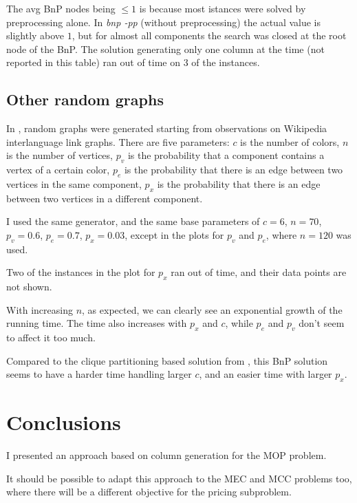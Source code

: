 \documentclass{article}
\begin{document}
The avg BnP nodes being $\le 1$ is because most istances were solved by preprocessing alone.
In \textit{bnp -pp} (without preprocessing) the actual value is slightly above $1$,
but for almost all components the search was closed at the root node of the BnP.
The solution generating only one column at the time (not reported in this table) ran out of time on 3 of the instances.

\subsection{Other random graphs}
\label{org}

In \parencite{mop2013}, random graphs were generated starting from observations on Wikipedia interlanguage link graphs.
There are five parameters:
$c$ is the number of colors,
$n$ is the number of vertices,
$p_v$ is the probability that a component contains a vertex of a certain color,
$p_e$ is the probability that there is an edge between two vertices in the same component,
$p_x$ is the probability that there is an edge between two vertices in a different component.

I used the same generator, and the same base parameters of $c=6$, $n=70$, $p_v=0.6$, $p_e=0.7$, $p_x=0.03$,
except in the plots for $p_v$ and $p_e$, where $n=120$ was used.

Two of the instances in the plot for $p_x$ ran out of time, and their data points are not shown.

\begin{center}
\def\svgwidth{\columnwidth}

\end{center}

With increasing $n$, as expected, we can clearly see an exponential growth of the running time.
The time also increases with $p_x$ and $c$, while $p_e$ and $p_v$ don't seem to affect it too much.

Compared to the clique partitioning based solution from \parencite{mop2013},
this BnP solution seems to have a harder time handling larger $c$, and an easier time with larger $p_x$.


\section{Conclusions}
I presented an approach based on column generation for the MOP problem.

It should be possible to adapt this approach to the MEC and MCC problems too,
where there will be a different objective for the pricing subproblem.
\end{document}
